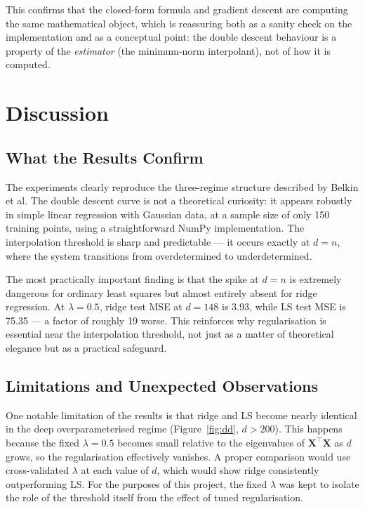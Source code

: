 \documentclass[11pt,a4paper]{article}
\begin{document}
This confirms that the closed-form formula and gradient descent are computing the same mathematical object, which is reassuring both as a sanity check on the implementation and as a conceptual point: the double descent behaviour is a property of the \emph{estimator} (the minimum-norm interpolant), not of how it is computed.

\section{Discussion}
%

\subsection{What the Results Confirm}

The experiments clearly reproduce the three-regime structure described by Belkin et al. The double descent curve is not a theoretical curiosity: it appears robustly in simple linear regression with Gaussian data, at a sample size of only 150 training points, using a straightforward NumPy implementation. The interpolation threshold is sharp and predictable --- it occurs exactly at $d = n$, where the system transitions from overdetermined to underdetermined.

The most practically important finding is that the spike at $d = n$ is extremely dangerous for ordinary least squares but almost entirely absent for ridge regression. At $\lambda = 0.5$, ridge test MSE at $d = 148$ is 3.93, while LS test MSE is 75.35 --- a factor of roughly 19 worse. This reinforces why regularisation is essential near the interpolation threshold, not just as a matter of theoretical elegance but as a practical safeguard.

\subsection{Limitations and Unexpected Observations}

One notable limitation of the results is that ridge and LS become nearly identical in the deep overparameterised regime (Figure~\ref{fig:dd}, $d > 200$). This happens because the fixed $\lambda = 0.5$ becomes small relative to the eigenvalues of $\mathbf{X}^\top\mathbf{X}$ as $d$ grows, so the regularisation effectively vanishes. A proper comparison would use cross-validated $\lambda$ at each value of $d$, which would show ridge consistently outperforming LS. For the purposes of this project, the fixed $\lambda$ was kept to isolate the role of the threshold itself from the effect of tuned regularisation.
\end{document}
